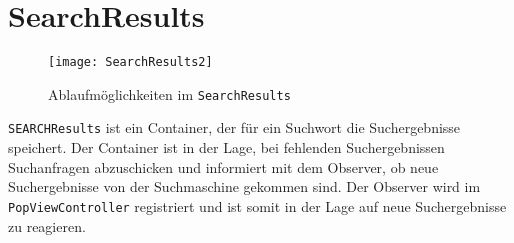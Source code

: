 
\section{SearchResults}
\begin{figure}[htb]
  \centering
  \texttt{[image: SearchResults2]}
  \caption{Ablaufmöglichkeiten im \lstinline|SearchResults|}
\end{figure}

\lstinline|SEARCHResults| ist ein Container, der für ein Suchwort die Suchergebnisse speichert.
Der Container ist in der Lage, bei fehlenden Suchergebnissen Suchanfragen abzuschicken und informiert mit dem Observer, ob neue Suchergebnisse von der Suchmaschine gekommen sind. Der Observer wird im \lstinline|PopViewController| registriert und ist somit in der Lage auf neue Suchergebnisse zu reagieren. 
